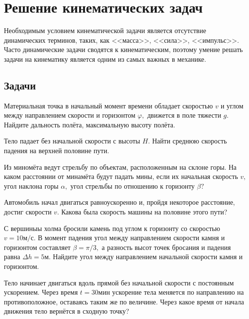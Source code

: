 \section{Решение кинематических задач }
Необходимым условием кинематической задачи является отсутствие динамических терминов, таких, как
<<масса>>, <<сила>>, <<импульс>>. 
Часто динамические задачи сводятся к кинематическим, поэтому
умение решать задачи на кинематику является одним из самых важных в механике. 
\subsection{Задачи}
\begin{task}
Материальная точка в начальный момент времени обладает скоростью $v$ и углом между
направлением скорости и горизонтом $\varphi,$ движется в поле тяжести $g$. Найдите
дальность полёта, максимальную высоту полёта.
\label{task:k-95-1}
\end{task}
\begin{task}
Тело падает без начальной скорости с высоты $H.$ Найти среднюю скорость падения на верхней
половине пути.
\label{task:k-96-1}
\end{task}
\begin{task}
Из миномёта ведут стрельбу по объектам, расположенным на склоне горы. На каком расстоянии от минамёта
будут падать мины, если их начальная скорость $v,$ угол наклона горы $\alpha,$ угол стрельбы по отношению к
горизонту $\beta?$
\label{task:k-96-2}
\end{task}
\begin{task}
Автомобиль начал двигаться равноускоренно и, пройдя некоторое расстояние, достиг скорости $v.$
Какова была скорость машины на половине этого пути?
\label{task:k-97-1-1}
\end{task}
\begin{task}
С вершиныы холма бросили камень под углом к горизонту со скоростью $v = 10\text{м/с}.$ В момент падения
угол  между направлением скорости камня и горизонтом составляет $\beta = \pi/3,$ а разность высот точек
бросания и падения равна $\Delta h = 5 \text{м}.$ Найдите угол между направлением начальной скорости
камня и горизонтом.
\label{task:k-97-4-1}
\end{task}
\begin{task}
Тело начинает двигаться вдоль прямой без начальной скорости с постоянным ускорением. Через время
$t=30\text{мин}$ ускорение тела меняется по направлению на противоположное, оставаясь таким же по величине.
Через какое время от начала движения тело вернётся в сходную точку?
\label{task:k-97-1-2}
\end{task}
